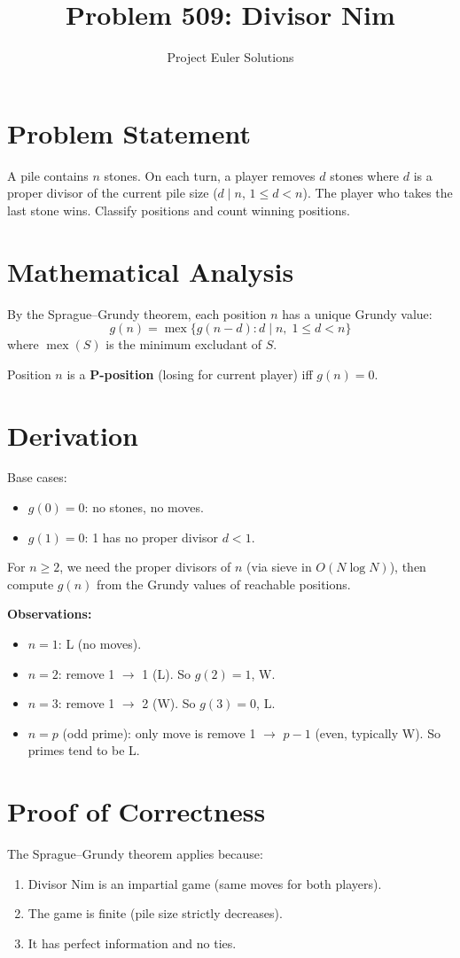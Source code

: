\documentclass[11pt]{article}
\title{Problem 509: Divisor Nim}
\author{Project Euler Solutions}
\date{}
\begin{document}
\maketitle

\section{Problem Statement}
A pile contains $n$ stones. On each turn, a player removes $d$ stones where $d$ is a proper divisor of the current pile size ($d \mid n$, $1 \leq d < n$). The player who takes the last stone wins. Classify positions and count winning positions.

\section{Mathematical Analysis}
By the Sprague--Grundy theorem, each position $n$ has a unique Grundy value:
\[
g(n) = \operatorname{mex}\{g(n-d) : d \mid n,\; 1 \leq d < n\}
\]
where $\operatorname{mex}(S)$ is the minimum excludant of $S$.

Position $n$ is a \textbf{P-position} (losing for current player) iff $g(n) = 0$.

\section{Derivation}
Base cases:
\begin{itemize}
    \item $g(0) = 0$: no stones, no moves.
    \item $g(1) = 0$: 1 has no proper divisor $d < 1$.
\end{itemize}

For $n \geq 2$, we need the proper divisors of $n$ (via sieve in $O(N\log N)$), then compute $g(n)$ from the Grundy values of reachable positions.

\textbf{Observations:}
\begin{itemize}
    \item $n = 1$: L (no moves).
    \item $n = 2$: remove 1 $\to$ 1 (L). So $g(2) = 1$, W.
    \item $n = 3$: remove 1 $\to$ 2 (W). So $g(3) = 0$, L.
    \item $n = p$ (odd prime): only move is remove 1 $\to$ $p-1$ (even, typically W). So primes tend to be L.
\end{itemize}

\section{Proof of Correctness}
The Sprague--Grundy theorem applies because:
\begin{enumerate}
    \item Divisor Nim is an impartial game (same moves for both players).
    \item The game is finite (pile size strictly decreases).
    \item It has perfect information and no ties.
\end{enumerate}
\end{document}
